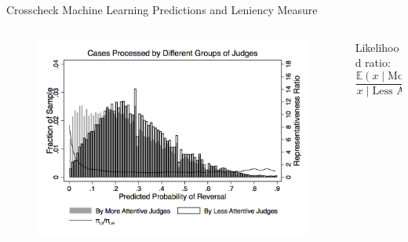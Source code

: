 \begin{frame}{Crosscheck Machine Learning Predictions and Leniency Measure}
    \begin{columns}[T]
    \begin{column}{0.6\textwidth}

        \begin{figure}
            \centering
            \includegraphics[height = 0.6 \textheight]{images/dist.png}
            \end{figure}
    \end{column}
        
    \begin{column}{0.35\textwidth}
        Likelihood ratio:
        $$
        \frac{\mathbb{E}(x\mid \text{More Attentive})}{x\mid \text{Less Attentive}}
        $$
        
    \end{column}
    \end{columns}
    
\end{frame}